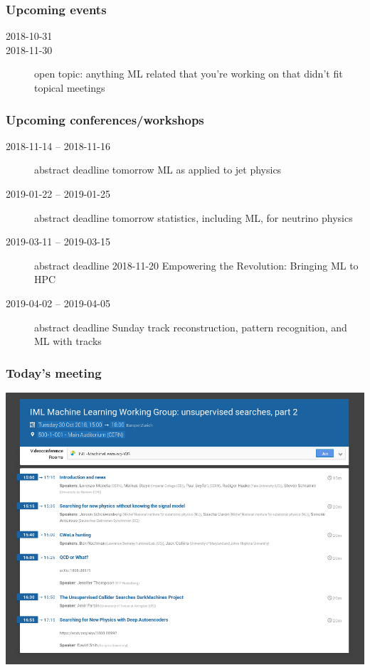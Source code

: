 \begin{frame}
  \frametitle{Upcoming events}
  \begin{description}
    \item[2018-10-31] 
    \item[2018-11-30] 
      \newline open topic: anything ML related that you're working on that didn't fit topical meetings
  \end{description}
\end{frame}
\begin{frame}
  \frametitle{Upcoming conferences/workshops}
  \begin{description}
    \item[2018-11-14 -- 2018-11-16]  abstract deadline tomorrow
      \newline ML as applied to jet physics
    \item[2019-01-22 -- 2019-01-25]  abstract deadline tomorrow
      \newline statistics, including ML, for neutrino physics
    \item[2019-03-11 -- 2019-03-15]  abstract deadline 2018-11-20
      \newline Empowering the Revolution: Bringing ML to HPC
    \item[2019-04-02 -- 2019-04-05]  abstract deadline Sunday
      \newline track reconstruction, pattern recognition, and ML with tracks
  \end{description}
\end{frame}

\begin{frame}
  \frametitle{Today's meeting}
  \includegraphics[width=.9\textwidth]{./agenda.png}
\end{frame}


